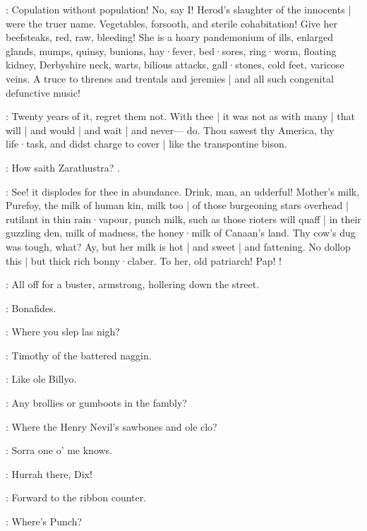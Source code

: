 :
Copulation without population!
No,
say I!
Herod's slaughter of the innocents |
were the truer name.
Vegetables,
forsooth,
and sterile cohabitation!
Give her beefsteaks,
red,
raw,
bleeding!
She is a hoary pandemonium of ills,
enlarged glands,
mumps,
quinsy,
bunions,
hay·fever,
bed·sores,
ring·worm,
floating kidney,
Derbyshire neck,
warts,
bilious attacks,
gall·stones,
cold feet,
varicose veins.
A truce to threnes and trentals and jeremies |
and all such congenital defunctive music!

:
Twenty years of it,
regret them not.
With thee |
it was not as with many |
that will |
and would |
and wait |
and never---%
do.
Thou sawest thy America,
thy life·task,
and didst charge to cover |
like the transpontine bison.

:
How saith Zarathustra?
.

:
See!
it displodes for thee in abundance.
Drink,
man,
an udderful!
Mother's milk,
Purefoy,
the milk of human kin,
milk too |
of those burgeoning stars overhead |
rutilant in thin rain·vapour,
punch milk,
such as those rioters will quaff |
in their guzzling den,
milk of madness,
the honey·milk of Canaan's land.
Thy cow's dug was tough,
what?
Ay,
but her milk is hot |
and sweet |
and fattening.
No dollop this |
but thick rich bonny·claber.
To her,
old patriarch!
Pap!
!



:
All off for a buster,
armstrong,
hollering down the street.

\dixon:
Bonafides.

\lynch:
Where you slep las nigh?

\crotthers:
Timothy of the battered naggin.

\stephen:
Like ole Billyo.

\punch:
Any brollies or gumboots in the fambly?

\lenehan:
Where the Henry Nevil's sawbones and ole clo?

\mulligan:
Sorra one o' me knows.

\madden:
Hurrah there,
Dix!

:
Forward to the ribbon counter.

\dixon:
Where's Punch?

